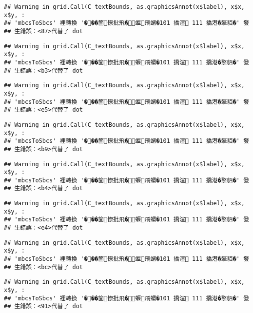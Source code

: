 \documentclass[
]{article}
\begin{document}
\begin{verbatim}
## Warning in grid.Call(C_textBounds, as.graphicsAnnot(x$label), x$x, x$y, :
## 'mbcsToSbcs' 裡轉換 '���箇憭批飛�蝘飛蝟�101 撟渲 111 撟港�摮貊�' 發
## 生錯誤：<87>代替了 dot
\end{verbatim}

\begin{verbatim}
## Warning in grid.Call(C_textBounds, as.graphicsAnnot(x$label), x$x, x$y, :
## 'mbcsToSbcs' 裡轉換 '���箇憭批飛�蝘飛蝟�101 撟渲 111 撟港�摮貊�' 發
## 生錯誤：<b3>代替了 dot
\end{verbatim}

\begin{verbatim}
## Warning in grid.Call(C_textBounds, as.graphicsAnnot(x$label), x$x, x$y, :
## 'mbcsToSbcs' 裡轉換 '���箇憭批飛�蝘飛蝟�101 撟渲 111 撟港�摮貊�' 發
## 生錯誤：<e5>代替了 dot
\end{verbatim}

\begin{verbatim}
## Warning in grid.Call(C_textBounds, as.graphicsAnnot(x$label), x$x, x$y, :
## 'mbcsToSbcs' 裡轉換 '���箇憭批飛�蝘飛蝟�101 撟渲 111 撟港�摮貊�' 發
## 生錯誤：<b9>代替了 dot
\end{verbatim}

\begin{verbatim}
## Warning in grid.Call(C_textBounds, as.graphicsAnnot(x$label), x$x, x$y, :
## 'mbcsToSbcs' 裡轉換 '���箇憭批飛�蝘飛蝟�101 撟渲 111 撟港�摮貊�' 發
## 生錯誤：<b4>代替了 dot
\end{verbatim}

\begin{verbatim}
## Warning in grid.Call(C_textBounds, as.graphicsAnnot(x$label), x$x, x$y, :
## 'mbcsToSbcs' 裡轉換 '���箇憭批飛�蝘飛蝟�101 撟渲 111 撟港�摮貊�' 發
## 生錯誤：<e4>代替了 dot
\end{verbatim}

\begin{verbatim}
## Warning in grid.Call(C_textBounds, as.graphicsAnnot(x$label), x$x, x$y, :
## 'mbcsToSbcs' 裡轉換 '���箇憭批飛�蝘飛蝟�101 撟渲 111 撟港�摮貊�' 發
## 生錯誤：<bc>代替了 dot
\end{verbatim}

\begin{verbatim}
## Warning in grid.Call(C_textBounds, as.graphicsAnnot(x$label), x$x, x$y, :
## 'mbcsToSbcs' 裡轉換 '���箇憭批飛�蝘飛蝟�101 撟渲 111 撟港�摮貊�' 發
## 生錯誤：<91>代替了 dot
\end{verbatim}
\end{document}
